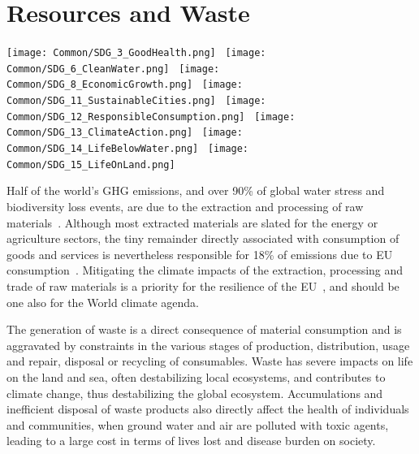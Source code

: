 \documentclass[../SustainableHEP.tex]{subfiles}
\begin{document}
\RaggedRight
\sloppy
\newpage


\section{Resources and Waste}
\label{sec:Waste}


\begin{center}
\texttt{[image: Common/SDG\_3\_GoodHealth.png]}~
\texttt{[image: Common/SDG\_6\_CleanWater.png]}~
\texttt{[image: Common/SDG\_8\_EconomicGrowth.png]}~
\texttt{[image: Common/SDG\_11\_SustainableCities.png]}~
\texttt{[image: Common/SDG\_12\_ResponsibleConsumption.png]}~
\texttt{[image: Common/SDG\_13\_ClimateAction.png]}~
\texttt{[image: Common/SDG\_14\_LifeBelowWater.png]}~
\texttt{[image: Common/SDG\_15\_LifeOnLand.png]}
\end{center}


\exSum
 \noindent

Half of the world's GHG emissions, and over 90\% of global water stress and biodiversity loss events, are due to the extraction and processing of raw materials~\cite{EURaw}. Although most extracted materials are slated for the energy or agriculture sectors, the tiny remainder directly associated with consumption of goods and services is nevertheless responsible for 18\% of emissions due to EU consumption~\cite{EURaw}. Mitigating the climate impacts of the extraction, processing and trade of raw materials is a priority for the resilience of the EU~\cite{EURaw}, and should be one also for the World climate agenda.

The generation of waste is a direct consequence of material consumption and is aggravated by constraints in the various stages of production, distribution, usage and repair, disposal or recycling of consumables. Waste has severe impacts on life on the land and sea, often destabilizing local ecosystems, and contributes to climate change, thus destabilizing the global ecosystem. Accumulations and inefficient disposal of waste products also directly affect the health of individuals and communities, when ground water and air are polluted with toxic agents, leading to a large cost in terms of lives lost and disease burden on society. 
\end{document}
